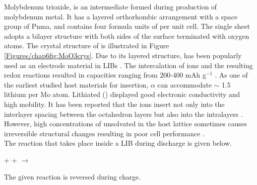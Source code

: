 Molybdenum trioxide,  is an intermediate formed during production of molybdenum metal. It has a layered orthorhombic arrangement with a space group of Pnma, and contains four formula units of  per unit cell. The single sheet adopts a bilayer structure with both sides of the surface terminated with oxygen atoms. The crystal structure of  is illustrated in Figure \ref{Figures/chap6fig:MoO3crys}. Due to its layered structure,  has been popularly used as an electrode material in LIBs \cite{wu_mixed_2017,li_vapor-transportation_2006,tsumura_lithium_1997}. The intercalation of  ions and the resulting redox reactions resulted in capacities ranging from 200-400 mAh g$^{-1}$ \cite{tsumura_lithium_1997,chen_fast_2010,zhou_-moo3_2010}. As one of the earliest studied host materials for  insertion, $\alpha$  can accommodate $\sim$ 1.5 lithium per Mo atom. Lithiated  () displayed good electronic conductivity and high  mobility. It has been reported that the  ions insert not only into the interlayer spacing between the  octahedron layers but also into the  intralayers \cite{li_vapor-transportation_2006,chen_fast_2010}. However, high concentrations of unsolvated  in the host lattice sometimes causes irreversible structural changes resulting in poor cell performance \cite{tao_moo3_2011,li_theoretical_2014}.\\
The reaction that takes place inside a LIB during discharge is given below. 

\begin{center}
     +  +  $\longrightarrow$  \cite{li_vapor-transportation_2006}
\end{center}

The given reaction is reversed during charge.

